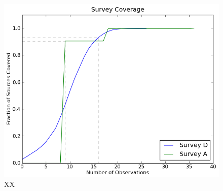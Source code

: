 \documentclass[12pt,a4paper,twoside]{article}
\begin{document}
\begin{figure}[ht]
\begin{center}
\includegraphics[width=\textwidth]{coverage.png}
\end{center}
\caption{XX \label{fig:coverage}}
\end{figure}
\end{document}
